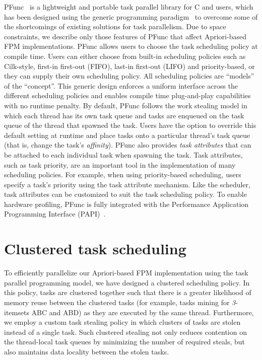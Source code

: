 \documentclass{IOS-Book-Article}
\begin{document}
PFunc~\cite{kambadur09:pfunc} is a lightweight and portable task parallel
library for C and \Cpp{} users, which has been designed using the generic
programming paradigm~\cite{garcia05:_extended_comparing05} to overcome some of
the shortcomings of existing solutions for task parallelism.  Due to space
constraints, we describe only those features of PFunc that affect Apriori-based
FPM implementations.
PFunc allows users to choose the task scheduling policy at compile time. Users
can either choose from built-in scheduling policies such as Cilk-style,
first-in first-out (FIFO), last-in first-out (LIFO) and priority-based, or
they can supply their own scheduling policy. All scheduling policies are
``models'' of the  ``concept''. This generic design enforces a
uniform interface across the different scheduling policies and enables compile
time plug-and-play capabilities with no runtime penalty.
By default, PFunc follows the work stealing model in which each thread has its
own task queue and tasks are enqueued on the task queue of the thread that
spawned the task.  Users have the option to override this default setting at
runtime and place tasks onto a particular thread's task queue (that is, change
the task's \textit{affinity}).
PFunc also provides \textit{task attributes} that can be attached to each
individual task when spawning the task. Task attributes, such as task
priority, are an important tool in the implementation of many scheduling
policies. For example, when using priority-based scheduling, users specify a
task's priority using the task attribute mechanism. Like the scheduler, task
attributes can be customized to suit the task scheduling policy. 
To enable hardware profiling, PFunc is fully integrated with the Performance
Application Programming Interface (PAPI)~\cite{papi}.

\section{Clustered task scheduling}
\label{sec:cluster}
To efficiently parallelize our Apriori-based FPM implementation using the task
parallel programming model, we have designed a clustered scheduling policy.
In this policy, tasks are clustered together such that there is a greater
likelihood of memory reuse between the clustered tasks (for example, tasks
mining for \textit{3}-itemsets ABC and ABD) as they are executed by the same
thread.  Furthermore, we employ a custom task stealing policy in which clusters
of tasks are stolen instead of a single task.  Such clustered stealing not
only reduces contention on the thread-local task queues by minimizing the
number of required steals, but also maintains data locality between the stolen
tasks.
\end{document}
